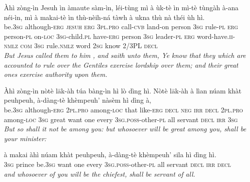 \documentclass[11pt,a4paper]{article}
\begin{document}
\begin{exe}
\gll Àhì zòng-ìn Jesuh ìn àmaute sàm-ìn, léi-tùng mì à ùk-tè ìn mì-tè tùngàh à-ana néi-ìn, mì à makai-tè ìn thù-nèih-ná tàwh à ukna thù nà théi ùh hì. \\
     be.\textsc{3sg} although-\textsc{erg} \textsc{jesuh} \textsc{erg} \textsc{3pl}.\textsc{pro} call-\textsc{cvb} land-on person \textsc{3sg} rule-\textsc{pl} \textsc{erg} person-\textsc{pl} on-\textsc{loc} \textsc{3sg}-child.\textsc{pl} have-\textsc{erg} person \textsc{3sg} leader-\textsc{pl} \textsc{erg} word-have.\textsc{ii}-\textsc{nmlz} \textsc{com} \textsc{3sg} rule.\textsc{nmlz} word \textsc{2sg} know 2/3PL \textsc{decl} \\
\glt \textcolor{kjvcolor}{\textit{But Jesus called them to him , and saith unto them, Ye know that they which are accounted to rule over the Gentiles exercise lordship over them; and their great ones exercise authority upon them.}}

\gll Àhì zòng-ìn nòtè lāk-àh túa bàng-ìn hì lò dìng hì. Nòtè lāk-àh à lìan núam khàt peuhpeuh, à-dàng-tè khèmpeuh' nàsèm hì dìng à, \\
     be.\textsc{3sg} although-\textsc{erg} \textsc{2pl}.\textsc{pro} among-\textsc{loc} that like-\textsc{erg} \textsc{decl} \textsc{neg} \textsc{irr} \textsc{decl} \textsc{2pl}.\textsc{pro} among-\textsc{loc} \textsc{3sg} great want one every \textsc{3sg}.\textsc{poss}-other-\textsc{pl} all servant \textsc{decl} \textsc{irr} \textsc{3sg} \\
\glt \textcolor{kjvcolor}{\textit{But so shall it not be among you: but whosoever will be great among you, shall be your minister:}}

\gll à makai àhì núam khàt peuhpeuh, à-dàng-tè khèmpeuh' sila hì dìng hì. \\
     \textsc{3sg} prince be.\textsc{3sg} want one every \textsc{3sg}.\textsc{poss}-other-\textsc{pl} all servant \textsc{decl} \textsc{irr} \textsc{decl} \\
\glt \textcolor{kjvcolor}{\textit{and whosoever of you will be the chiefest, shall be servant of all.}}


\end{exe}
\end{document}

